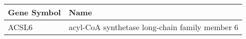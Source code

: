 \begin{tabular}{ll}
\toprule
Gene Symbol &                                           Name \\
\midrule
      ACSL6 & acyl-CoA synthetase long-chain family member 6 \\
\bottomrule
\end{tabular}
